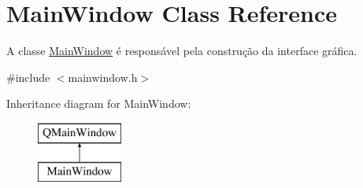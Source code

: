\hypertarget{class_main_window}{}\section{Main\+Window Class Reference}
\label{class_main_window}


A classe \mbox{\hyperlink{class_main_window}{Main\+Window}} é responsável pela construção da interface gráfica.  




{\ttfamily \#include $<$mainwindow.\+h$>$}

Inheritance diagram for Main\+Window\+:\begin{figure}[H]
\begin{center}
\leavevmode
\includegraphics[height=2.000000cm]{class_main_window}
\end{center}
\end{figure}
